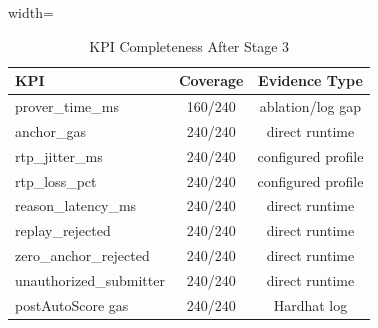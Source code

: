 \begin{table}[!t]
\centering
\caption{KPI Completeness After Stage 3}
\label{tab:kpi_completeness}
\begin{adjustbox}{width=\columnwidth}
\begin{tabular}{lcc}
\toprule
KPI & Coverage & Evidence Type \\
\midrule
prover\_time\_ms & 160/240 & ablation/log gap \\
anchor\_gas & 240/240 & direct runtime \\
rtp\_jitter\_ms & 240/240 & configured profile \\
rtp\_loss\_pct & 240/240 & configured profile \\
reason\_latency\_ms & 240/240 & direct runtime \\
replay\_rejected & 240/240 & direct runtime \\
zero\_anchor\_rejected & 240/240 & direct runtime \\
unauthorized\_submitter & 240/240 & direct runtime \\
postAutoScore gas & 240/240 & Hardhat log \\
\bottomrule
\end{tabular}
\end{adjustbox}
\end{table}
